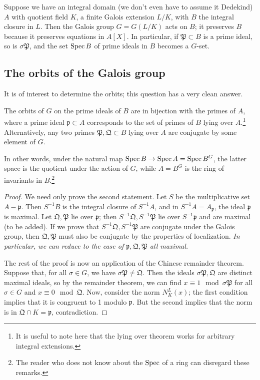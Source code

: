  Suppose we have an integral domain (we don't even have to assume it Dedekind) $A$ with quotient field $K$, a finite Galois extension $L/K$, with $B$ the integral closure in $L$.  Then the Galois group $G = G(L/K)$ acts on $B$; it preserves $B$ because it preserves equations in $A[X]$.
In particular, if $\mathfrak{P} \subset B$ is a prime ideal, so is $\sigma \mathfrak{P}$, and the set $\operatorname{Spec} B$ of prime ideals in $B$ becomes a $G$-set.

\subsection{The orbits of the Galois group} It is of interest to determine the orbits; this question has  a very clean answer.

\begin{proposition} The orbits of $G$ on the prime ideals of $B$ are in bijection with the primes of $A$, where a prime ideal $\mathfrak{p} \subset A$ corresponds to the set of primes of $B$ lying over $A$.\footnote{It is useful to note here that the lying over theorem works for arbitrary integral extensions.}  Alternatively, any two primes $\mathfrak{P}, \mathfrak{Q} \subset B$ lying over $A$ are conjugate by some element of $G$.
\end{proposition}

In other words, under the natural map $\operatorname{Spec} B \to \operatorname{Spec} A =\operatorname{Spec} B^G$, the latter space is the quotient under the action of $G$, while $A=B^G$ is the ring of invariants in $B$.\footnote{The reader who does not know about the $\operatorname{Spec}$ of a ring can disregard these remarks.}

\begin{proof} 
We need only prove the second statement. 
Let $S$ be the multiplicative set $A - \mathfrak{p}$.  Then $S^{-1}B $ is the integral closure of $S^{-1}A$, and in $S^{-1}A = A_{\mathfrak{p}}$, the ideal $\mathfrak{p}$ is maximal. 
Let $\mathfrak{Q}, \mathfrak{P}$ lie over $\mathfrak{p}$; then $S^{-1}\mathfrak{Q},S^{-1} \mathfrak{P}$  lie over $S^{-1}\mathfrak{p}$ and are maximal (to be added).  If we prove that $S^{-1} \mathfrak{Q}, S^{-1} \mathfrak{P}$ are conjugate under the Galois group, then $\mathfrak{Q}, \mathfrak{P}$ must also be conjugate by the properties of localization.  \emph{In particular, we can reduce to the case of $\mathfrak{p}, \mathfrak{Q}, \mathfrak{P}$ all maximal.}

The rest of the proof is now an application of the Chinese remainder theorem.  Suppose that, for all $\sigma \in G$, we have $\sigma \mathfrak{P} \neq \mathfrak{Q}$.  Then the ideals $\sigma \mathfrak{P}, \mathfrak{Q}$ are distinct maximal ideals, so by the remainder theorem, we can find $x \equiv 1 \mod \sigma \mathfrak{P}$ for all $\sigma \in G$ and $x \equiv  0 \mod \mathfrak{Q}$.
Now, consider the norm $N^L_K(x)$; the first condition implies that it is congruent to 1 modulo $\mathfrak{p}$.  But the second implies that  the norm is in $\mathfrak{Q} \cap K = \mathfrak{p}$, contradiction.
\end{proof}

